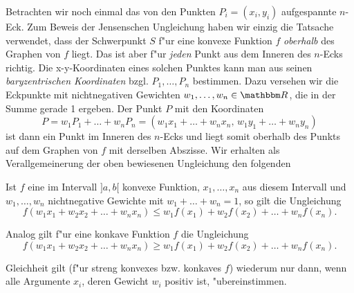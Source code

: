 \documentclass[11pt]{article}
\begin{document}
Betrachten wir noch einmal das von den Punkten $P_i=(x_i,y_i)$
aufgespannte $n$-Eck. Zum Beweis der Jensenschen Ungleichung haben wir
einzig die Tatsache verwendet, dass der Schwerpunkt $S$ f"ur eine
konvexe Funktion $f$ {\em oberhalb} des Graphen von $f$ liegt. Das ist
aber f"ur {\em jeden} Punkt aus dem Inneren des $n$-Ecks richtig. Die
x-y-Koordinaten eines solchen Punktes kann man aus seinen {\em
baryzentrischen Koordinaten} bzgl. $P_1,\ldots,P_n$ bestimmen. Dazu
versehen wir die Eckpunkte mit nichtnegativen Gewichten
$w_1,\ldots,w_n\in {\R}$, die in der Summe gerade 1 ergeben. Der
Punkt $P$ mit den Koordinaten
\[P=w_1P_1+\ldots+w_nP_n=\left(w_1x_1+\ldots+w_nx_n,\,
w_1y_1+\ldots+w_ny_n \right)\]
ist dann ein Punkt im Inneren des $n$-Ecks und liegt somit oberhalb
des Punkts auf dem Graphen von $f$ mit derselben Abszisse. Wir
erhalten als Verallgemeinerung der oben bewiesenen Ungleichung den
folgenden 
\begin{satz}  Ist $f$ eine im
Intervall $]a,b[$ konvexe \linebreak Funktion, $x_1,\ldots,x_n$
aus diesem Intervall und $w_1,\ldots,w_n$ nichtnegative Gewichte
mit $w_1+\ldots+w_n=1$, so gilt die Ungleichung
\[f\left(w_1x_1+w_2x_2+\ldots+w_nx_n\right)\leq w_1f(x_1)+w_2f(x_2)
+\ldots +w_nf(x_n).\]

Analog gilt f"ur eine konkave Funktion $f$ die Ungleichung
\[f\left(w_1x_1+w_2x_2+\ldots+w_nx_n\right)\geq w_1f(x_1)+w_2f(x_2)
+\ldots +w_nf(x_n).\]

Gleichheit gilt (f"ur streng konvexes bzw. konkaves $f$) wiederum nur
dann, wenn alle Argumente $x_i$, deren Gewicht $w_i$ positiv ist,
"ubereinstimmen.
\end{satz}
\end{document}
